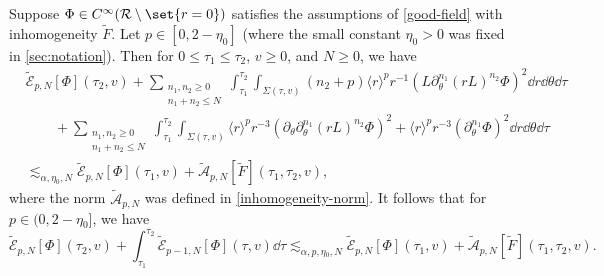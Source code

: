 \documentclass[10pt, reqno]{amsart}
\begin{document}
\begin{proposition}
Suppose \(\Phi{}\in C^\infty(\mathcal{R}\setminus \set{r=0})\) satisfies the assumptions of \cref{good-field} with inhomogeneity \(\tilde{F}\). Let \(p\in
[0,2-\eta_0]\) (where the small constant \(\eta_0 > 0\) was fixed in
\cref{sec:notation}). Then for \(0\le \tau_1\le \tau_2\), \(v\ge 0\), and \(N\ge 0\), we have
\begin{equation}\label{rp-general-equation}
\begin{split}
&\tilde{\mathcal{E}}_{p,N}[\Phi{}](\tau{}_2,v) + \sum_{\substack{n_1,n_2\ge 0 \\ n_1+n_2\le N}}\int_{\tau{}_1}^{\tau{}_2} \int _{\Sigma{}(\tau{},v)}(n_2+p)\langle{}r\rangle^pr^{-1}(L\partial{}_\theta^{n_1}(rL)^{n_2}\Phi{})^2 \dd{}r\dd{}\theta{}\dd{}\tau{}\\
&\qquad + \sum_{\substack{n_1,n_2\ge 0 \\ n_1+n_2\le N}}\int_{\tau{}_1}^{\tau{}_2} \int _{\Sigma{}(\tau{},v)} \langle{}r\rangle^pr^{-3}(\partial{}_{\theta{}}\partial{}_\theta^{n_1}(rL)^{n_2}\Phi{})^2 + \langle{}r\rangle^pr^{-3}(\partial{}_\theta^{n_1}\Phi{})^2\dd{}r\dd{}\theta{}\dd{}\tau{}\\
& \lesssim_{\alpha{},\eta{}_0,N} \tilde{\mathcal{E}}_{p,N}[\Phi{}](\tau{}_1,v) + \tilde{\mathcal{A}}_{p,N}[\tilde{F}](\tau{}_1,\tau{}_2,v),
\end{split}
\end{equation}
where the norm \(\mathcal{\tilde{A}}_{p,N}\) was defined in
\cref{inhomogeneity-norm}. It follows that for \(p\in (0,2-\eta{}_0]\), we have
\begin{equation}\label{rp-general-hierarchy}
\tilde{\mathcal{E}}_{p,N}[\Phi{}](\tau{}_2,v) + \int_{\tau{}_1}^{\tau{}_2} \tilde{\mathcal{E}}_{p-1,N}[\Phi{}](\tau{},v)\dd{}\tau{} \lesssim_{\alpha{},p,\eta{}_0,N} \tilde{\mathcal{E}}_{p,N}[\Phi{}](\tau{}_1,v) + \tilde{\mathcal{A}}_{p,N}[\tilde{F}](\tau{}_1,\tau{}_2,v).
\end{equation}
\label{rp-general}
\end{proposition}
\end{document}
